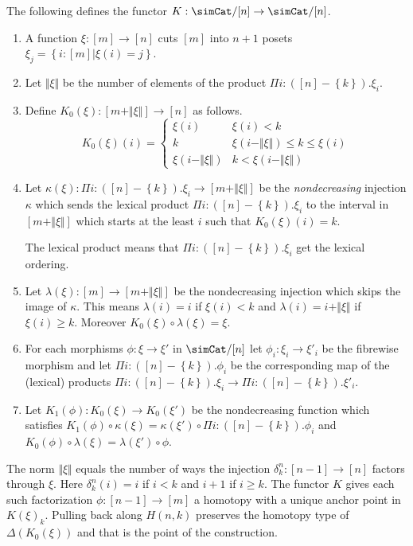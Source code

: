 \documentclass{tac}
\newcommand\set[1]{\left\{#1\right\}}
\newcommand\of{:}
\newcommand\norm[1]{\Vert #1 \Vert}
\newcommand\ka\kappa
\newcommand\la\lambda
\begin{document}
\begin{definition}
The following defines the functor $K\of\simCat/[n]\to\simCat/[n]$.
\begin{enumerate}
\item A function $\xi\of[m]\to[n]$ cuts $[m]$ into $n+1$ posets $\xi_j = \set{i\of[m]|\xi(i)=j}$. 
\item Let $\norm \xi$ be the number of elements of the product $\Pi i\of ([n]-\set k).\xi_i$. 
\item Define $K_0(\xi)\of [m+\norm\xi]\to [n]$ as follows.
\[ 
	K_0(\xi)(i) = \left\{
		\begin{array}{cc}
			\xi(i) & \xi(i)<k \\
			k & \xi(i-\norm\xi)\leq k \leq \xi(i)\\
			\xi(i-\norm\xi) & k<\xi(i-\norm\xi)
		\end{array}
	\right.
\]
\item Let $\ka(\xi)\of\Pi i\of([n]-\set k).\xi_i \to [m+\norm\xi]$ be the \emph{nondecreasing} injection $\ka$ which sends the lexical product $\Pi i\of([n]-\set k).\xi_i$ to the interval in $[m+\norm\xi]$ which starts at the least $i$ such that $K_0(\xi)(i)=k$.

The lexical product means that $\Pi i\of([n]-\set k).\xi_i$ get the lexical ordering. %

\item Let $\la(\xi)\of[m]\to[m+\norm\xi]$ be the nondecreasing injection which skips the image of $\ka$. This means $\la(i)=i$ if $\xi(i)<k$ and $\la(i)=i+\norm\xi$ if $\xi(i)\geq k$. Moreover $K_0(\xi)\circ\la(\xi) = \xi$.
\item For each morphisms $\phi\of\xi\to\xi'$ in $\simCat/[n]$ let $\phi_i\of\xi_i\to\xi'_i$ be the fibrewise morphism and let $\Pi i\of([n]-\set k).\phi_i$ be the corresponding map of the (lexical) products $\Pi i\of([n]-\set k).\xi_i\to\Pi i\of([n]-\set k).\xi'_i$.
\item Let $K_1(\phi)\of K_0(\xi)\to K_0(\xi')$ be the nondecreasing function which satisfies $K_1(\phi)\circ \ka(\xi) = \ka(\xi')\circ \Pi i\of([n]-\set k).\phi_i$ and $K_0(\phi)\circ \la(\xi) = \la(\xi')\circ \phi$.
\end{enumerate}
\end{definition}

The norm $\norm\xi$ equals the number of ways the injection $\delta^n_k\of[n-1]\to[n]$ factors through $\xi$. Here $\delta^n_k(i)=i$ if $i<k$ and $i+1$ if $i\geq k$. The functor $K$ gives each such factorization $\phi\of[n-1]\to [m]$ a homotopy with a unique anchor point in $K(\xi)_k$.  Pulling back along $H(n,k)$ preserves the homotopy type of $\Delta(K_0(\xi))$ and that is the point of the construction. %
\end{document}
